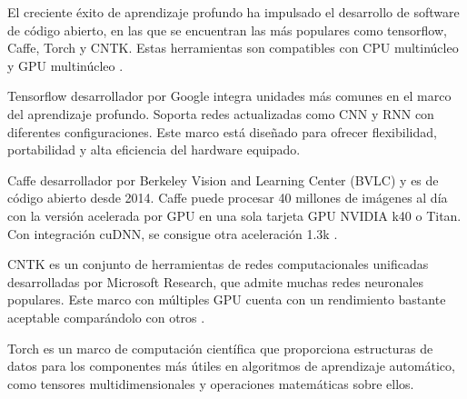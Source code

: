 El creciente éxito de aprendizaje profundo ha impulsado el desarrollo de software de código abierto, en las que se encuentran las más populares como tensorflow, Caffe, Torch y CNTK. Estas herramientas son compatibles con CPU multinúcleo y GPU multinúcleo \citep{shi2016benchmarking,liu2020application}.

Tensorflow desarrollador por Google integra unidades más comunes en el marco del aprendizaje profundo. Soporta redes actualizadas como CNN y RNN con diferentes configuraciones. Este marco está diseñado para ofrecer flexibilidad, portabilidad y alta eficiencia del hardware equipado.

Caffe desarrollador por Berkeley Vision and Learning Center (BVLC) y es de código abierto desde 2014. Caffe puede procesar 40 millones de imágenes al día con la versión acelerada por GPU en una sola tarjeta GPU NVIDIA k40 o Titan. Con integración cuDNN, se consigue otra aceleración 1.3k \citep{chetlur2014cudnn}.

CNTK es un conjunto de herramientas de redes computacionales unificadas desarrolladas por Microsoft Research, que admite muchas redes neuronales populares. Este marco con múltiples GPU cuenta con un rendimiento bastante aceptable comparándolo con otros \citep{huang2015microsoft}.

Torch es un marco de computación científica que proporciona estructuras de datos para los componentes más útiles en algoritmos de aprendizaje automático, como tensores multidimensionales y operaciones matemáticas sobre ellos.


